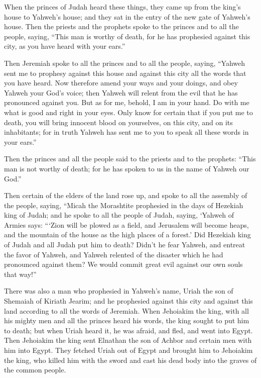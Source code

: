  When the princes of Judah heard these things, they came up
from the king's house to Yahweh's house; and they sat in the entry of
the new gate of Yahweh's house.  Then the priests and the
prophets spoke to the princes and to all the people, saying, ``This man
is worthy of death, for he has prophesied against this city, as you have
heard with your ears.''

 Then Jeremiah spoke to all the princes and to all the
people, saying, ``Yahweh sent me to prophesy against this house and
against this city all the words that you have heard.  Now
therefore amend your ways and your doings, and obey Yahweh your God's
voice; then Yahweh will relent from the evil that he has pronounced
against you.  But as for me, behold, I am in your hand. Do
with me what is good and right in your eyes.  Only know for
certain that if you put me to death, you will bring innocent blood on
yourselves, on this city, and on its inhabitants; for in truth Yahweh
has sent me to you to speak all these words in your ears.''

 Then the princes and all the people said to the priests
and to the prophets: ``This man is not worthy of death; for he has
spoken to us in the name of Yahweh our God.''

 Then certain of the elders of the land rose up, and spoke
to all the assembly of the people, saying,  ``Micah the
Morashtite prophesied in the days of Hezekiah king of Judah; and he
spoke to all the people of Judah, saying, `Yahweh of Armies says:
```Zion will be plowed as a field, and Jerusalem will become heaps, and
the mountain of the house as the high places of a forest.' 
Did Hezekiah king of Judah and all Judah put him to death? Didn't he
fear Yahweh, and entreat the favor of Yahweh, and Yahweh relented of the
disaster which he had pronounced against them? We would commit great
evil against our own souls that way!''

 There was also a man who prophesied in Yahweh's name,
Uriah the son of Shemaiah of Kiriath Jearim; and he prophesied against
this city and against this land according to all the words of Jeremiah.
 When Jehoiakim the king, with all his mighty men and all
the princes heard his words, the king sought to put him to death; but
when Uriah heard it, he was afraid, and fled, and went into Egypt.
 Then Jehoiakim the king sent Elnathan the son of Achbor
and certain men with him into Egypt.  They fetched Uriah
out of Egypt and brought him to Jehoiakim the king, who killed him with
the sword and cast his dead body into the graves of the common people.

